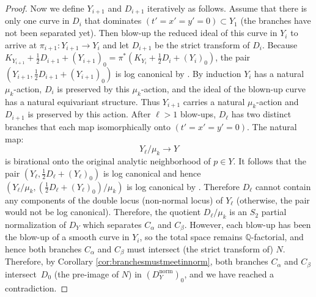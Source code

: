 \documentclass[JEP,XML,SOM,Unicode,NoFloatCountersInSection,published]{cedram}
\theoremstyle{plain}
\theoremstyle{definition}
\newcommand\QQ{{\mathbb Q}}
\newcommand\norm{{\mathrm{norm}}}
\begin{document}
\begin{proof}
Now we define $Y_{i+1}$ and $D_{i+1}$ iteratively as follows. Assume that there is only one curve in $D_{i}$ that dominates $(t'=x'=y'=0)\subset Y_1$ (\ie the branches have not been separated yet). Then blow-up the reduced ideal of this curve in $Y_i$ to arrive at $\pi_{i+1}: Y_{i+1} \to Y_i$ and let $D_{i+1}$ be the strict transform of $D_i$. Because $K_{Y_{i+1}} + \frac{1}{2}D_{i+1} + (Y_{i+1})_0 = \pi^*(K_{Y_i} + \frac{1}{2}D_i + (Y_i)_0)$, the pair $(Y_{i+1}, \frac{1}{2}D_{i+1} + (Y_{i+1})_0)$ is log canonical by \cite[Lem.\,2.30]{KollarMori}. By induction $Y_i$ has a natural $\mu_k$-action, $D_i$ is preserved by this $\mu_k$-action, and the ideal of the blown-up curve has a natural equivariant structure. Thus $Y_{i+1}$ carries a natural $\mu_k$-action and $D_{i+1}$ is preserved by this action. After $\ell>1$ blow-ups, $D_\ell$ has two distinct branches that each map isomorphically onto $(t'=x'=y'=0)$. The natural map:
\[
Y_\ell/\mu_k\to Y
\]
is birational onto the original analytic neighborhood of $p\in Y$. It follows that the pair $(Y_\ell, \frac{1}{2}D_\ell + (Y_\ell)_0)$ is log canonical and hence $(Y_\ell/\mu_k,(\frac{1}{2}D_\ell+(Y_\ell)_0)/\mu_k)$ is log canonical by \cite[Prop.\,5.20]{KollarMori}. Therefore $D_{\ell}$ cannot contain any components of the double locus (non-normal locus) of $Y_\ell$ (otherwise, the pair would not be log canonical). Therefore, the quotient $D_\ell/\mu_k$ is an $S_2$ partial normalization of $D_Y$ which separates $C_\alpha$ and $C_\beta$. However, each blow-up has been the blow-up of a smooth curve in $Y_i$, so the total space remains $\QQ$-factorial, and hence both branches $C_\alpha$ and $C_\beta$ must intersect (the strict transform of) $N$. Therefore, by Corollary \ref{cor:branchesmustmeetinnorm}, both branches $C_\alpha$ and $C_\beta$ intersect~$D_0$ (the pre-image of $N$) in $(D^\norm_Y)_0$, and we have reached a contradiction.
\end{proof}

\backmatter


\end{document}
